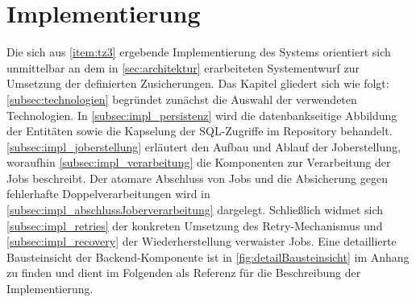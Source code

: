 \section{Implementierung}
\label{sec:implementierung}
Die sich aus \ref{item:tz3} ergebende Implementierung des Systems orientiert sich unmittelbar an dem in \cref{sec:architektur}
erarbeiteten Systementwurf zur Umsetzung der definierten Zusicherungen.
Das Kapitel gliedert sich wie folgt:
\cref{subsec:technologien} begründet zunächst die Auswahl der verwendeten Technologien.
In \cref{subsec:impl_persistenz} wird die datenbankseitige Abbildung der Entitäten sowie die Kapselung der SQL-Zugriffe im Repository behandelt.
\cref{subsec:impl_joberstellung} erläutert den Aufbau und Ablauf der Joberstellung, woraufhin
\cref{subsec:impl_verarbeitung} die Komponenten zur Verarbeitung der Jobs beschreibt.
Der atomare Abschluss von Jobs und die Absicherung gegen fehlerhafte Doppelverarbeitungen wird in
\cref{subsec:impl_abschlussJoberverarbeitung} dargelegt.
Schließlich widmet sich \cref{subsec:impl_retries} der konkreten Umsetzung des Retry-Mechanismus und \cref{subsec:impl_recovery}
der Wiederherstellung verwaister Jobs.
Eine detaillierte Bausteinsicht der Backend-Komponente ist in \cref{fig:detailBausteinsicht} im Anhang zu finden und
dient im Folgenden als Referenz für die Beschreibung der Implementierung.

